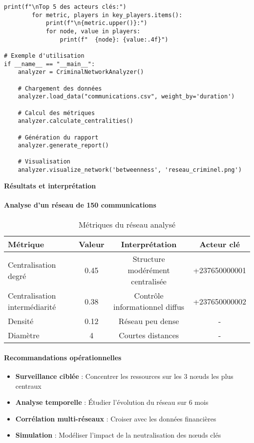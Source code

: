\documentclass[12pt,a4paper]{article}
\begin{document}
\begin{lstlisting}[caption=Analyse de réseau criminel avec NetworkX]
        print(f"\nTop 5 des acteurs clés:")
        for metric, players in key_players.items():
            print(f"\n{metric.upper()}:")
            for node, value in players:
                print(f"  {node}: {value:.4f}")

# Exemple d'utilisation
if __name__ == "__main__":
    analyzer = CriminalNetworkAnalyzer()
    
    # Chargement des données
    analyzer.load_data("communications.csv", weight_by='duration')
    
    # Calcul des métriques
    analyzer.calculate_centralities()
    
    # Génération du rapport
    analyzer.generate_report()
    
    # Visualisation
    analyzer.visualize_network('betweenness', 'reseau_criminel.png')
\end{lstlisting}

\textbf{Résultats et interprétation}

\paragraph{Analyse d'un réseau de 150 communications}
\begin{table}[H]
\centering
\begin{tabular}{|l|c|c|c|}
\hline
\textbf{Métrique} & \textbf{Valeur} & \textbf{Interprétation} & \textbf{Acteur clé} \\
\hline
Centralisation degré & 0.45 & Structure modérément centralisée & +237650000001 \\
\hline
Centralisation intermédiarité & 0.38 & Contrôle informationnel diffus & +237650000002 \\
\hline
Densité & 0.12 & Réseau peu dense & - \\
\hline
Diamètre & 4 & Courtes distances & - \\
\hline
\end{tabular}
\caption{Métriques du réseau analysé}
\end{table}

\paragraph{Recommandations opérationnelles}
\begin{itemize}
\item \textbf{Surveillance ciblée} : Concentrer les ressources sur les 3 nœuds les plus centraux
\item \textbf{Analyse temporelle} : Étudier l'évolution du réseau sur 6 mois
\item \textbf{Corrélation multi-réseaux} : Croiser avec les données financières
\item \textbf{Simulation} : Modéliser l'impact de la neutralisation des nœuds clés
\end{itemize}
\end{document}
